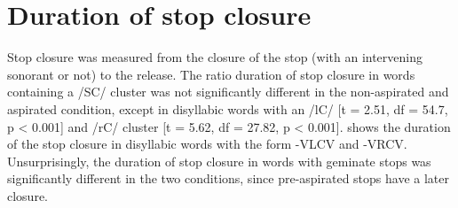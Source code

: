 \documentclass[11pt,a4paper,openany]{memoir}\usepackage[]{graphicx}\usepackage[]{color}
\begin{document}
\section{Duration of stop closure}


Stop closure was measured from the closure of the stop (with an intervening sonorant or not) to the release.
The ratio duration of stop closure in words containing a /SC/ cluster was not significantly different in the non-aspirated and aspirated condition, except in disyllabic words with an /lC/ [t = 2.51, df = 54.7, p < 0.001] and /rC/ cluster [t = 5.62, df = 27.82, p < 0.001].
 shows the duration of the stop closure in disyllabic words with the form -VLCV and -VRCV.
Unsurprisingly, the duration of stop closure in words with geminate stops was significantly different in the two conditions, since pre-aspirated stops have a later closure.
\end{document}
